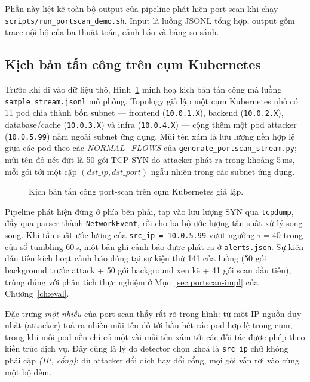 Phần này liệt kê toàn bộ output của pipeline phát hiện port-scan khi chạy
\texttt{scripts/run\_portscan\_demo.sh}. Input là luồng JSONL tổng hợp,
output gồm trace nội bộ của ba thuật toán, cảnh báo và bảng so sánh.

\subsection{Kịch bản tấn công trên cụm Kubernetes}
\label{sec:trace:k8s-attack}

Trước khi đi vào dữ liệu thô, Hình~\ref{fig:k8s-attack-scenario} minh hoạ
kịch bản tấn công mà luồng \texttt{sample\_stream.jsonl} mô phỏng. Topology
giả lập một cụm Kubernetes nhỏ có 11 pod chia thành bốn subnet --- frontend
(\texttt{10.0.1.X}), backend (\texttt{10.0.2.X}), database/cache
(\texttt{10.0.3.X}) và infra (\texttt{10.0.4.X}) --- cộng thêm một pod attacker
(\texttt{10.0.5.99}) nằm ngoài subnet ứng dụng. Mũi tên xám là lưu lượng nền
hợp lệ giữa các pod theo các \textit{NORMAL\_FLOWS} của
\texttt{generate\_portscan\_stream.py}; mũi tên đỏ nét đứt là 50 gói TCP SYN do
attacker phát ra trong khoảng 5\,ms, mỗi gói tới một cặp
$(\textit{dst\_ip}, \textit{dst\_port})$ ngẫu nhiên trong các subnet ứng dụng.

\begin{figure}[H]
  \centering
  \resizebox{\linewidth}{!}{}
  \caption{Kịch bản tấn công port-scan trên cụm Kubernetes giả lập.}
  \label{fig:k8s-attack-scenario}
\end{figure}

\noindent Pipeline phát hiện đứng ở phía bên phải, tap vào lưu lượng SYN qua
\texttt{tcpdump}, đẩy qua parser thành \texttt{NetworkEvent}, rồi cho ba bộ
ước lượng tần suất xử lý song song. Khi tần suất ước lượng của
\texttt{src\_ip = 10.0.5.99} vượt ngưỡng $\tau = 40$ trong cửa sổ tumbling
60\,s, một bản ghi cảnh báo được phát ra ở \texttt{alerts.json}. Sự kiện đầu
tiên kích hoạt cảnh báo đúng tại sự kiện thứ 141 của luồng (50 gói background
trước attack + 50 gói background xen kẽ + 41 gói scan đầu tiên), trùng đúng
với phân tích thực nghiệm ở Mục~\ref{sec:portscan-impl} của Chương~\ref{ch:eval}.

Đặc trưng \emph{một-nhiều} của port-scan thấy rất rõ trong hình: từ một IP
nguồn duy nhất (attacker) toả ra nhiều mũi tên đỏ tới hầu hết các pod hợp lệ
trong cụm, trong khi mỗi pod nền chỉ có một vài mũi tên xám tới các đối tác
được phép theo kiến trúc dịch vụ. Đây cũng là lý do detector chọn khoá là
\texttt{src\_ip} chứ không phải cặp \textit{(IP, cổng)}: dù attacker đổi đích
hay đổi cổng, mọi gói vẫn rơi vào cùng một bộ đếm.

